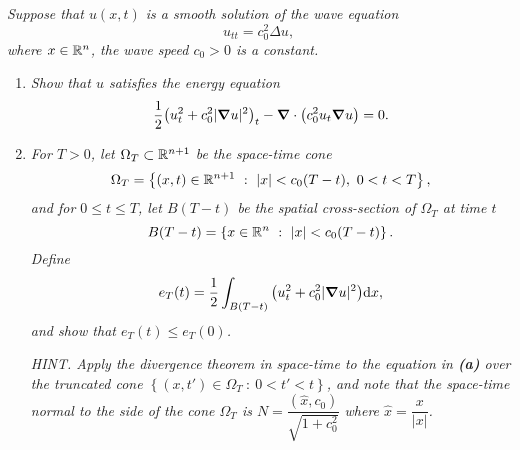 \emph{Suppose that $u(x,t)$ is a smooth solution of the wave equation $$u_{tt} = c_0^2 \Delta u,$$ where $x \in \mathbb{R}^n$, the wave speed $c_0 > 0$ is a constant.}
\begin{enumerate}[\bf (a)]
    \item
        \emph{Show that $u$ satisfies the energy equation $$\frac{1}{2}\qty(u_t^2 + c_0^2|\grad u|^2)_t - \grad \cdot \qty(c_0^2 u_t\grad u) = 0.$$}
    \item
        \emph{For $T > 0$, let $\Omega_T \subset \mathbb{R}^{n+1}$ be the space-time cone $$\Omega_T = \left\{(x,t) \in \mathbb{R}^{n+1}\ :\ |x| < c_0(T - t),\ 0 < t < T\right\},$$ and for $0 \leq t \leq T$, let $B(T - t)$ be the spatial cross-section of $\Omega_T$ at time $t$ $$B(T - t) = \left\{x \in \mathbb{R}^n\ :\ |x| < c_0(T - t)\right\}.$$  Define $$e_T(t) = \frac{1}{2}\int_{B(T - t)}\qty(u_t^2 + c_0^2|\grad u|^2)\dd x,$$ and show that $e_T(t) \leq e_T(0)$.}

        \emph{HINT.  Apply the divergence theorem in space-time to the equation in \textbf{(a)} over the truncated cone $\left\{(x, t') \in \Omega_T\ :\ 0 < t' < t\right\}$, and note that the space-time normal to the side of the cone $\Omega_T$ is $N = \dfrac{(\hat{x}, c_0)}{\sqrt{1 + c_0^2}}$ where $\hat{x} = \dfrac{x}{|x|}$.} \\


\end{enumerate}
